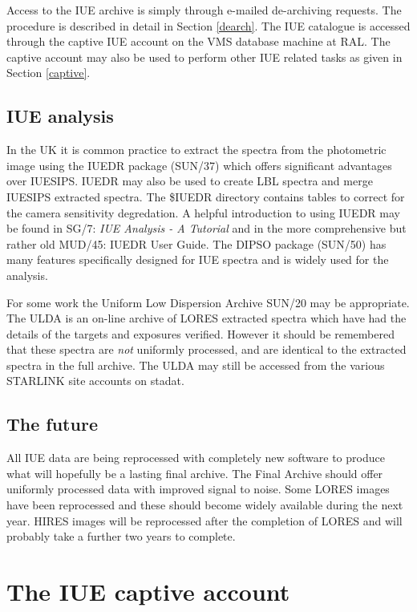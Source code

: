 \documentclass[11pt,twoside]{article}
\newcommand{\xref}[3]{#1}
\newcommand{\xlabel}[1]{}
\begin{document}
Access to the IUE archive is simply through e-mailed de-archiving requests.
The procedure is described in detail in Section \ref{dearch}.
The IUE catalogue is accessed through the captive IUE account on the VMS
database machine at RAL.
The captive account may also be used to perform other
IUE related tasks as given in Section \ref{captive}.

\subsection {IUE analysis}

In the UK it is common practice to extract the spectra from the photometric
image using the \xref{IUEDR}{sun37}{} package (SUN/37)
which offers significant advantages over IUESIPS.
IUEDR may also be used to create LBL spectra and merge IUESIPS extracted
spectra.
The \$IUEDR directory contains tables to correct for the camera sensitivity
degredation.
A helpful introduction to using IUEDR may be found in
\xref{SG/7: {\em IUE Analysis - A
Tutorial}}{sg7}{} and in the more comprehensive but rather old MUD/45: IUEDR User
Guide.
The \xref{DIPSO}{sun50}{} package (SUN/50) has many features specifically designed for IUE
spectra and is widely used for the analysis.

For some work the Uniform Low Dispersion Archive \xref{SUN/20}{sun20}{} may be appropriate.
The ULDA is an on-line archive of LORES extracted spectra which have had the
details of the targets and exposures verified.
However it should be remembered that
these spectra are {\it not} uniformly processed, and are identical to the
extracted spectra in the full archive.
The ULDA may still be accessed from the various STARLINK site accounts on
stadat.

\subsection {The future}

All IUE data are being reprocessed with completely new software to produce what
will hopefully be a lasting final archive.
The Final Archive should offer uniformly processed data with improved signal to
noise.
Some LORES images have been reprocessed and these should become widely
available during the next year.
HIRES images will be reprocessed after the completion of LORES and will
probably take a further two years to complete.

\section {The IUE captive account
\xlabel{the_iue_captive_account}\label{captive}}
\end{document}
